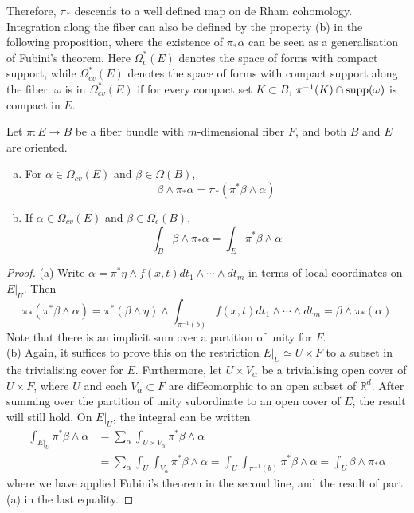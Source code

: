 Therefore, $\pi_*$ descends to a well defined map on de Rham cohomology. 
Integration along the fiber can also be defined by the property (b) in the
following proposition, where the existence of $\pi_*\alpha$ can be seen as a 
generalisation of Fubini's theorem.
Here $\Omega_c^*(E)$ denotes the space of forms with compact support, while 
$\Omega_{cv}^*(E)$ denotes the space of forms with compact support along the
fiber: $\omega$ is in $\Omega_{cv}^*(E)$ if for every compact set $K \subset B$, 
$\pi^{-1}(K)\cap \operatorname{supp}(\omega)$ is compact in $E$. 
\begin{prop} %
	\label{prop:projection_formula}
	Let $\pi : E \to B$ be a fiber bundle with  $m$-dimensional fiber $F$, and
	both $B$ and  $E$ are oriented. 
	\begin{enumerate}[(a), leftmargin=\parindent]
	    \item For $\alpha\in \Omega_{cv}(E)$ and $\beta\in\Omega(B)$, 
	\[
		\beta\wedge \pi_*\alpha = \pi_*(\pi^*\beta\wedge\alpha)  
	\] 
		\item If $\alpha \in \Omega_{cv}(E)$ and $\beta\in \Omega_{c}(B)$,
			\[
			\int_B \beta\wedge \pi_*\alpha =  \int_E \pi^*\beta\wedge\alpha
			\] 
	\end{enumerate}
\end{prop}
\begin{proof}
	(a) Write $\alpha = \pi^*\eta \wedge f(x,t) dt_1\wedge\cdots\wedge dt_m $
	in terms of local coordinates on $E|_U$. Then 
	\[
	\pi_*(\pi^*\beta\wedge \alpha)
	=\pi^*(\beta\wedge\eta)\wedge \int_{\pi^{-1}(b)}f(x,t) 
	dt_1\wedge\cdots\wedge dt_m 	
	= \beta\wedge\pi_*(\alpha)
	\] 
	Note that there is an implicit sum over a partition of unity for $F$.\\
	(b) Again, it suffices to prove this on the restriction $E|_U\simeq U\times F$ to a
	subset in the trivialising cover for $E$. Furthermore,
	let $U\times V_\alpha$ be a trivialising open cover of $U\times F$, 
	where $U$ and each $V_{\alpha}\subset F$ are diffeomorphic to an open subset of
	$\mathbb{R}^d$. After summing over the partition of unity
	subordinate to an open cover of $E$, 
	the result will still hold. On $E|_U$, the integral can be written
	\begin{align*}
		\int_{E|_U} \pi^*\beta\wedge \alpha
		&= \sum_\alpha\int_{U \times V_\alpha}\pi^*\beta\wedge \alpha \\
		&= \sum_\alpha\int_{U}\int_{V_\alpha}\pi^*\beta\wedge \alpha
		= \int_{U}\int_{\pi^{-1}(b)}\pi^*\beta\wedge \alpha
		= \int_{U}\beta\wedge \pi_*\alpha 
	\end{align*}
	where we have applied Fubini's theorem in the second line, and the result of
	part (a) in the last equality.
\end{proof}


